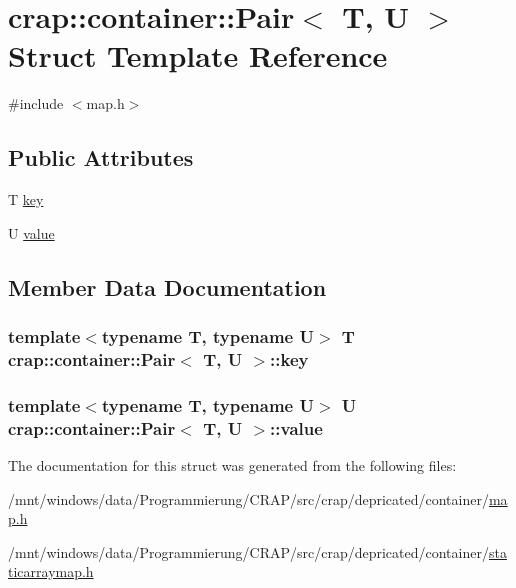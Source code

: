 \hypertarget{structcrap_1_1container_1_1_pair}{\section{crap\-:\-:container\-:\-:Pair$<$ T, U $>$ Struct Template Reference}
\label{structcrap_1_1container_1_1_pair}
}


{\ttfamily \#include $<$map.\-h$>$}

\subsection*{Public Attributes}
\begin{DoxyCompactItemize}
\item 
T \hyperlink{structcrap_1_1container_1_1_pair_ac195fff076d289225223c909a91f70be}{key}
\item 
U \hyperlink{structcrap_1_1container_1_1_pair_ac648918676e7627a2e73e9fffbee3b5a}{value}
\end{DoxyCompactItemize}


\subsection{Member Data Documentation}
\hypertarget{structcrap_1_1container_1_1_pair_ac195fff076d289225223c909a91f70be}{
\subsubsection[{key}]{\setlength{\rightskip}{0pt plus 5cm}template$<$typename T, typename U$>$ T {\bf crap\-::container\-::\-Pair}$<$ T, U $>$\-::key}}\label{structcrap_1_1container_1_1_pair_ac195fff076d289225223c909a91f70be}
\hypertarget{structcrap_1_1container_1_1_pair_ac648918676e7627a2e73e9fffbee3b5a}{
\subsubsection[{value}]{\setlength{\rightskip}{0pt plus 5cm}template$<$typename T, typename U$>$ U {\bf crap\-::container\-::\-Pair}$<$ T, U $>$\-::value}}\label{structcrap_1_1container_1_1_pair_ac648918676e7627a2e73e9fffbee3b5a}


The documentation for this struct was generated from the following files\-:\begin{DoxyCompactItemize}
\item 
/mnt/windows/data/\-Programmierung/\-C\-R\-A\-P/src/crap/depricated/container/\hyperlink{depricated_2container_2map_8h}{map.\-h}\item 
/mnt/windows/data/\-Programmierung/\-C\-R\-A\-P/src/crap/depricated/container/\hyperlink{staticarraymap_8h}{staticarraymap.\-h}\end{DoxyCompactItemize}
